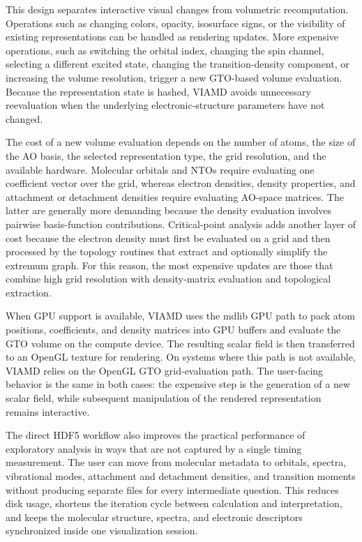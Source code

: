 \documentclass[journal=jacsat,manuscript=article]{achemso}
\begin{document}
This design separates interactive visual changes from volumetric recomputation. Operations such as changing colors, opacity, isosurface signs, or the visibility of existing representations can be handled as rendering updates. More expensive operations, such as switching the orbital index, changing the spin channel, selecting a different excited state, changing the transition-density component, or increasing the volume resolution, trigger a new GTO-based volume evaluation. Because the representation state is hashed, VIAMD avoids unnecessary reevaluation when the underlying electronic-structure parameters have not changed.

The cost of a new volume evaluation depends on the number of atoms, the size of the AO basis, the selected representation type, the grid resolution, and the available hardware. Molecular orbitals and NTOs require evaluating one coefficient vector over the grid, whereas electron densities, density properties, and attachment or detachment densities require evaluating AO-space matrices. The latter are generally more demanding because the density evaluation involves pairwise basis-function contributions. Critical-point analysis adds another layer of cost because the electron density must first be evaluated on a grid and then processed by the topology routines that extract and optionally simplify the extremum graph. For this reason, the most expensive updates are those that combine high grid resolution with density-matrix evaluation and topological extraction.

When GPU support is available, VIAMD uses the mdlib GPU path to pack atom positions, coefficients, and density matrices into GPU buffers and evaluate the GTO volume on the compute device. The resulting scalar field is then transferred to an OpenGL texture for rendering. On systems where this path is not available, VIAMD relies on the OpenGL GTO grid-evaluation path. The user-facing behavior is the same in both cases: the expensive step is the generation of a new scalar field, while subsequent manipulation of the rendered representation remains interactive.

The direct HDF5 workflow also improves the practical performance of exploratory analysis in ways that are not captured by a single timing measurement. The user can move from molecular metadata to orbitals, spectra, vibrational modes, attachment and detachment densities, and transition moments without producing separate files for every intermediate question. This reduces disk usage, shortens the iteration cycle between calculation and interpretation, and keeps the molecular structure, spectra, and electronic descriptors synchronized inside one visualization session.
\end{document}
